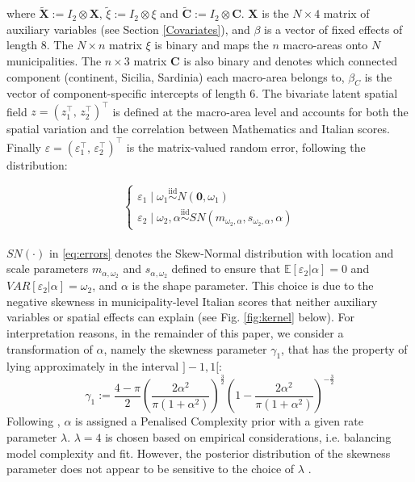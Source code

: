 \documentclass{book}
\begin{document}
where $\mathbf{\tilde{X}} := I_2 \otimes \mathbf{X}$, $\tilde{\xi} := I_2 \otimes \xi$ and $\mathbf{\tilde{C}} := I_2 \otimes \mathbf{C}$. $\mathbf{X}$ is the $N \times 4$ matrix of auxiliary variables (see Section \ref{Covariates}), and $\beta$ is a vector of fixed effects of length $8$. The $N \times n$ matrix $\xi$ is binary and maps the $n$ macro-areas onto $N$ municipalities. The $n \times 3$ matrix $\mathbf{C}$ is also binary and denotes which connected component (continent, Sicilia, Sardinia) each macro-area belongs to, $\beta_C$ is the vector of component-specific intercepts of length $6$. The bivariate latent spatial field $z = (z_1^{\top}, \, z_2^{\top})^{\top}$ is defined at the macro-area level and accounts for both the spatial variation and the correlation between Mathematics and Italian scores. Finally $\varepsilon = (\varepsilon_1^{\top} , \, \varepsilon_2^{\top})^{\top}$ is the matrix-valued random error, following the distribution:


\begin{equation}
\left\{
\begin{array}{ll}
\varepsilon_{1} \mid \omega_1 \overset{\text{iid}}{\sim}
N(\mathbf{0}, \omega_1)\\
\varepsilon_{2} \mid \omega_2, \alpha 
\overset{\text{iid}}{\sim} SN(m_{\omega_2, \alpha}, s_{\omega_2, \alpha}, \alpha)  
\end{array}
\right.
\label{eq:errors}
\end{equation} \\
$SN(\cdot)$ in \ref{eq:errors} denotes the Skew-Normal distribution \citep{SN} with location and scale parameters $m_{\alpha, \omega_2}$ and $ s_{\alpha, \omega_2}$ defined to ensure that $\mathbb{E}[\varepsilon_2 | \alpha] = 0 $ and $VAR[\varepsilon_2 | \alpha] = \omega_2$, and $\alpha$ is the shape parameter. This choice is due to the negative skewness in municipality-level Italian scores that neither auxiliary variables or spatial effects can explain (see Fig. \ref{fig:kernel} below). For interpretation reasons, in the remainder of this paper, we consider a transformation of $\alpha$, namely the skewness parameter $\gamma_1$, that has the property of lying approximately in the interval $]-1, 1[$:
$$
\gamma_{1} := \frac{4-\pi}{2}
\left(  \frac{2 \alpha^2}{\pi(1 + \alpha^2)} \right)^{\frac{3}{2}}
\left(  1 - \frac{2 \alpha^2}{\pi(1 + \alpha^2)} \right)^{-\frac{3}{2}}
$$
Following \cite{SNprior}, $\alpha$ is assigned a Penalised Complexity prior \cite{PC} with a given rate parameter $\lambda$. %
$\lambda = 4$ is chosen based on empirical considerations, i.e. balancing model complexity and fit. However, the posterior distribution of the skewness parameter does not appear to be sensitive to the choice of $\lambda$ \citep{SNprior}.\\
\end{document}
